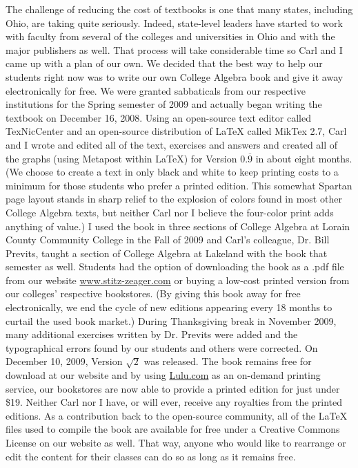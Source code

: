 \documentclass{ximera}
\begin{document}
\medskip

\noindent The challenge of reducing the cost of textbooks is one that many states, including Ohio, are taking quite seriously.  Indeed, state-level leaders have started to work with faculty from several of the colleges and universities in Ohio and with the major publishers as well.  That process will take considerable time so Carl and I came up with a plan of our own.  We decided that the best way to help our students right now was to write our own College Algebra book and give it away electronically for free.  We were granted sabbaticals from our respective institutions for the Spring semester of 2009 and actually began writing the textbook on December 16, 2008.  Using an open-source text editor called TexNicCenter and an open-source distribution of LaTeX called MikTex 2.7, Carl and I wrote and edited all of the text, exercises and answers and created all of the graphs (using Metapost within LaTeX) for Version $0.\overline{9}$ in about eight months.  (We choose to create a text in only black and white to keep printing costs to a minimum for those students who prefer a printed edition.  This somewhat Spartan page layout stands in sharp relief to the explosion of colors found in most other College Algebra texts, but neither Carl nor I believe the four-color print adds anything of value.)  I used the book in three sections of College Algebra at Lorain County Community College in the Fall of 2009 and Carl's colleague, Dr. Bill Previts, taught a section of College Algebra at Lakeland with the book that semester as well.  Students had the option of downloading the book as a .pdf file from our website \href{http://www.stitz-zeager.com}{www.stitz-zeager.com} or buying a low-cost printed version from our colleges' respective bookstores.  (By giving this book away for free electronically, we end the cycle of new editions appearing every 18 months to curtail the used book market.)  During Thanksgiving break in November 2009, many additional exercises written by Dr. Previts were added and the typographical errors found by our students and others were corrected. On December 10, 2009, Version $\sqrt{2}$ was released.  The book remains free for download at our website and by using \href{http://www.lulu.com/content/paperback-book/college-algebra/7513097}{Lulu.com} as an on-demand printing service, our bookstores are now able to provide a printed edition for just under \$19.  Neither Carl nor I have, or will ever, receive any royalties from the printed editions.    As a contribution back to the open-source community, all of the LaTeX files used to compile the book are available for free under a Creative Commons License on our website as well.  That way, anyone who would like to rearrange or edit the content for their classes can do so as long as it remains free.
\end{document}

